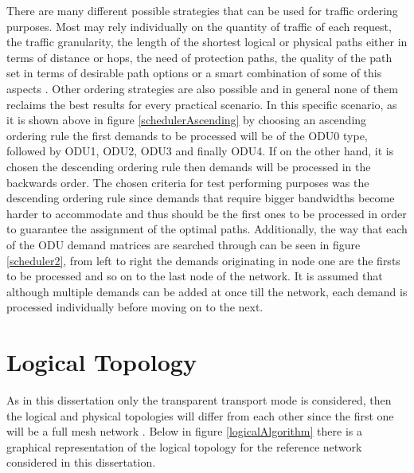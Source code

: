 There are many different possible strategies that can be used for traffic ordering purposes. Most may rely individually on the quantity of traffic of each request, the traffic granularity, the length of the shortest logical or physical paths either in terms of distance or hops, the need of protection paths, the quality of the path set in terms of desirable path options or a smart combination of some of this aspects \cite{SimmonsJane2008}. Other ordering strategies are also possible and in general none of them reclaims the best results for every practical scenario. In this specific scenario, as it is shown above in figure \ref{schedulerAscending} by choosing an ascending ordering rule the first demands to be processed will be of the ODU0 type, followed by ODU1, ODU2, ODU3 and finally ODU4. If on the other hand, it is chosen the descending ordering rule then demands will be processed in the backwards order. The chosen criteria for test performing purposes was the descending ordering rule since demands that require bigger bandwidths become harder to accommodate and thus should be the first ones to be processed in order to guarantee the assignment of the optimal paths.  Additionally, the way that each of the ODU demand matrices are searched through can be seen in figure \ref{scheduler2}, from left to right the demands originating in node one are the firsts to be processed and so on to the last node of the network. It is assumed that although multiple demands can be added at once till the network, each demand is processed individually before moving on to the next.
 
\section{Logical Topology}
\label{logicaltopology2}

As in this dissertation only the transparent transport mode is considered, then the logical and physical topologies will differ from each other since the first one will be a full mesh network \cite{Vasco}. Below in figure \ref{logicalAlgorithm} there is a graphical representation of the logical topology for the reference network considered in this dissertation.

